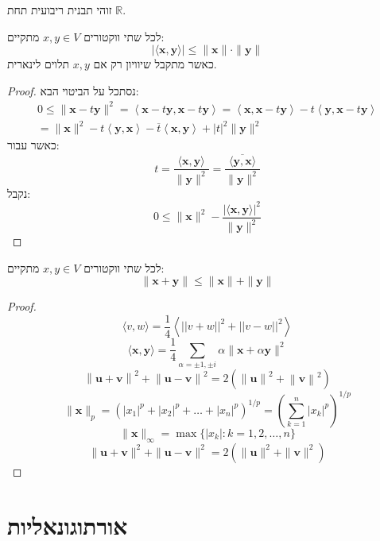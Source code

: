 \documentclass{tstextbook}
\begin{document}
\begin{remark}
זוהי תבנית ריבועית תחת \(\mathbb{R}\).

\end{remark}
\begin{theorem}
לכל שתי ווקטורים \(x,y \in V\) מתקיים:
$$|\langle\mathbf{x},\mathbf{y}\rangle|\leq\|\mathbf{x}\|\cdot\|\mathbf{y}\|$$
כאשר מתקבל שיוויון רק אם \(x,y\) תלוים לינארית.

\end{theorem}
\begin{proof}
נסתכל על הביטוי הבא:
\begin{gather*}0\leq\|\mathbf{x}-t\mathbf{y}\|^{2}=\left\langle \mathbf{x}-t\mathbf{y},\mathbf{x}-t\mathbf{y} \right\rangle=\left\langle \mathbf{x},\mathbf{x}-t\mathbf{y} \right\rangle-t\left\langle \mathbf{y},\mathbf{x}-t\mathbf{y} \right\rangle\\=\|\mathbf{x}\|^{2}-t\left\langle \mathbf{y},\mathbf{x} \right\rangle-\overline{t}\left\langle \mathbf{x},\mathbf{y} \right\rangle+|t|^{2}\|\mathbf{y}\|^{2} 
\end{gather*}
כאשר עבור:
$$t={\frac{\langle\mathbf{x},\mathbf{y}\rangle}{\|\mathbf{y}\|^{2}}}={\frac{\overline{{\langle\mathbf{y},\mathbf{x}\rangle}}}{\|\mathbf{y}\|^{2}}}$$
נקבל:
$$0\leq\|\mathbf{x}\|^{2}-{\frac{|\langle\mathbf{x},\mathbf{y}\rangle|^{2}}{\|\mathbf{y}\|^{2}}}$$

\end{proof}
\begin{corollary}
לכל שתי ווקטורים \(x,y \in V\) מתקיים:
$$\|\mathbf{x}+\mathbf{y}\|\leq\|\mathbf{x}\|+\|\mathbf{y}\|$$

\end{corollary}
\begin{proof}
$$\langle v,w \rangle = \frac{1}{4}\left\langle||v+w||^2 + ||v-w||^2\right\rangle$$$$\langle\mathbf{x},\mathbf{y}\rangle={\frac{1}{4}}\sum_{\alpha=\pm1,\pm i}\alpha\|\mathbf{x}+\alpha\mathbf{y}\|^{2}$$$$\left\|\mathbf{u}+\mathbf{v}\right\|^{2}+\left\|\mathbf{u}-\mathbf{v}\right\|^{2}=2(\left\|\mathbf{u}\right\|^{2}+\left\|\mathbf{v}\right\|^{2})$$$$\|\mathbf{x}\|_{p}=(|x_{1}|^{p}+|x_{2}|^{p}+\ldots+|x_{n}|^{p})^{1/p}=\left(\sum_{k=1}^{n}|x_{k}|^{p}\right)^{1/p}$$$$\|\mathbf{x}\|_{\infty}=\operatorname*{max}\{|x_{k}|:k=1,2,\ldots,n\}$$$$\|\mathbf{u}+\mathbf{v}\|^{2}+\|\mathbf{u}-\mathbf{v}\|^{2}=2(\|\mathbf{u}\|^{2}+\|\mathbf{v}\|^{2})$$

\end{proof}
\section{אורתוגונאליות}
\end{document}
